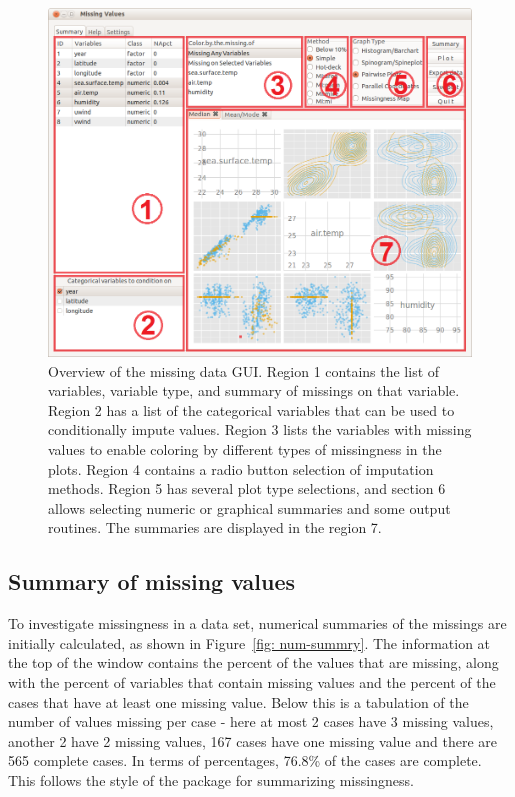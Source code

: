 \documentclass[article]{jss}
\begin{document}
\begin{center}
\begin{figure}[h]
\begin{centering}
\includegraphics[width=.9\textwidth]{graph/fig1-GUI-tab1}
\par\end{centering}
\caption{Overview of the missing data GUI. Region 1 contains the list of variables, variable type, and summary of missings on that variable. Region 2 has a list of the categorical variables that can be used to conditionally impute values. Region 3 lists the variables with missing values to enable coloring by different types of missingness in the plots. Region 4 contains a radio button selection of imputation methods. Region 5 has several plot type selections, and section 6 allows selecting numeric or graphical summaries and some output routines. The summaries are displayed in the region 7.}
\end{figure}
\label{fig: missingGUI}
\par\end{center}

\subsection{Summary of missing values}

To investigate missingness in a data set, numerical summaries of the missings are initially calculated, as shown in Figure~\ref{fig: num-summry}. The information at the top of the window contains the percent of the values that are missing, along with the percent of variables that contain missing values and the percent of the cases that have at least one missing value. Below this is a tabulation of the number of values missing per case - here at most 2 cases have 3 missing values, another 2 have 2 missing values, 167 cases have one missing value and there are 565 complete cases. In terms of percentages, 76.8\% of the cases are complete. This follows the style of the  package for summarizing missingness.
\end{document}
